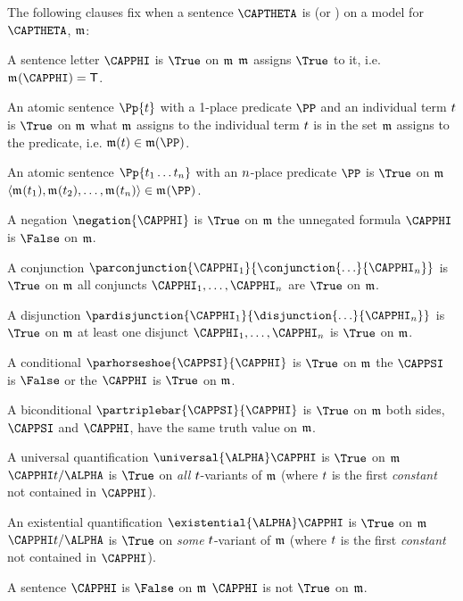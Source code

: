 \begin{majorILnc}{}
The following clauses fix when a \GQL{} sentence $\CAPTHETA$ is \nidf{$\True$} (or \nidf{$\False$}) on a model for $\CAPTHETA$, $\mathfrak{m}$:
\begin{cenumerate}
	\item A sentence letter $\CAPPHI$ is $\True$ on $\mathfrak{m}$ \Iff $\mathfrak{m^{\mathrm{}}_{\mathrm{}}}$ assigns $\True$ to it, i.e. \Iff $\As{}{}(\CAPPHI)=\TrueB$.
	\item An atomic sentence $\Pp{\variable{t}}$ with a 1-place predicate $\PP$ and an individual term $t$ is $\True$ on $\mathfrak{m}$ \Iff what $\mathfrak{m}$ assigns to the individual term $t$ is in the set $\mathfrak{m}$ assigns to the predicate, i.e. \Iff $\IntA(\variable{t})\in\IntA(\PP)$.
	\item\label{formtruthatomicn} An atomic sentence $\Pp{\variable{t}_1\ldots\variable{t}_{\integer{n}}}$ with an $n$-place predicate $\PP$ is $\True$ on $\mathfrak{m}$ \Iff $\langle \As{}{}(\variable{t}_1),\As{}{}(\variable{t}_2),\ldots,\As{}{}(\variable{t}_{\integer{n}}) \rangle \in \As{}{}(\PP)$. 
	\item A negation $\negation{\CAPPHI}$ is $\True$ on $\mathfrak{m}$ \Iff the unnegated formula $\CAPPHI$ is $\False$ on $\mathfrak{m}$.
	\item A conjunction $\parconjunction{\CAPPHI_1}{\conjunction{\ldots}{\CAPPHI_{\integer{n}}}}$ is $\True$ on $\mathfrak{m}$ \Iff all conjuncts $\CAPPHI_1,\ldots,\CAPPHI_{\integer{n}}$ are $\True$ on $\mathfrak{m}$.
	\item A disjunction $\pardisjunction{\CAPPHI_1}{\disjunction{\ldots}{\CAPPHI_{\integer{n}}}}$ is $\True$ on $\mathfrak{m}$ \Iff at least one disjunct $\CAPPHI_1,\ldots,\CAPPHI_{\integer{n}}$ is $\True$ on $\mathfrak{m}$.
	\item A conditional $\parhorseshoe{\CAPPSI}{\CAPPHI}$ is $\True$ on $\mathfrak{m}$ \Iff the  $\CAPPSI$ is $\False$ or the  $\CAPPHI$ is $\True$ on $\mathfrak{m}$.
	\item A biconditional $\partriplebar{\CAPPSI}{\CAPPHI}$ is $\True$ on $\mathfrak{m}$ \Iff both sides, $\CAPPSI$ and $\CAPPHI$, have the same truth value on $\mathfrak{m}$.
	\item\label{GQLTruthUnvQuant} A universal quantification $\universal{\ALPHA}\CAPPHI$ is $\True$ on $\mathfrak{m}$ \Iff $\CAPPHI\variable{t}/\ALPHA$ is $\True$ on \emph{all} $t$-variants of $\mathfrak{m}$ (where $t$ is the first \emph{constant} not contained in $\CAPPHI$).
	\item An existential quantification $\existential{\ALPHA}\CAPPHI$ is $\True$ on $\mathfrak{m}$ \Iff $\CAPPHI\variable{t}/\ALPHA$ is $\True$ on \emph{some} $t$-variant of $\mathfrak{m}$ (where $t$ is the first \emph{constant} not contained in $\CAPPHI$).
	\item A sentence $\CAPPHI$ is $\False$ on $\mathfrak{m}$ \Iff $\CAPPHI$ is not $\True$ on $\mathfrak{m}$.
\end{cenumerate}
\end{majorILnc}

